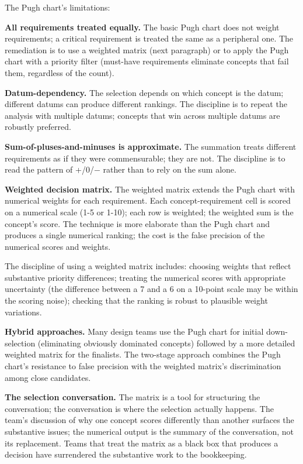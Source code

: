The Pugh chart's limitations:

\textbf{All requirements treated equally.} The basic Pugh chart does not weight requirements; a critical requirement is treated the same as a peripheral one. The remediation is to use a weighted matrix (next paragraph) or to apply the Pugh chart with a priority filter (must-have requirements eliminate concepts that fail them, regardless of the count).

\textbf{Datum-dependency.} The selection depends on which concept is the datum; different datums can produce different rankings. The discipline is to repeat the analysis with multiple datums; concepts that win across multiple datums are robustly preferred.

\textbf{Sum-of-pluses-and-minuses is approximate.} The summation treats different requirements as if they were commensurable; they are not. The discipline is to read the pattern of +/0/$-$ rather than to rely on the sum alone.

\textbf{Weighted decision matrix.} The weighted matrix extends the Pugh chart with numerical weights for each requirement. Each concept-requirement cell is scored on a numerical scale (1-5 or 1-10); each row is weighted; the weighted sum is the concept's score. The technique is more elaborate than the Pugh chart and produces a single numerical ranking; the cost is the false precision of the numerical scores and weights.

The discipline of using a weighted matrix includes: choosing weights that reflect substantive priority differences; treating the numerical scores with appropriate uncertainty (the difference between a 7 and a 6 on a 10-point scale may be within the scoring noise); checking that the ranking is robust to plausible weight variations.

\textbf{Hybrid approaches.} Many design teams use the Pugh chart for initial down-selection (eliminating obviously dominated concepts) followed by a more detailed weighted matrix for the finalists. The two-stage approach combines the Pugh chart's resistance to false precision with the weighted matrix's discrimination among close candidates.

\textbf{The selection conversation.} The matrix is a tool for structuring the conversation; the conversation is where the selection actually happens. The team's discussion of why one concept scores differently than another surfaces the substantive issues; the numerical output is the summary of the conversation, not its replacement. Teams that treat the matrix as a black box that produces a decision have surrendered the substantive work to the bookkeeping.

